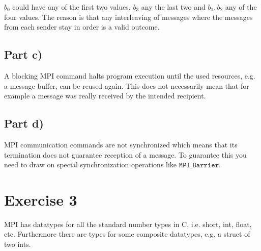 \documentclass[10pt,a4paper]{article}
\begin{document}
$b_{0}$ could have any of the first two values, $b_{3}$ any the last two and $b_{1}, b_{2}$ any of the four values.
The reason is that any interleaving of messages where the messages from each sender stay in order is a valid outcome.

\subsection*{Part c)}

A blocking MPI command halts program execution until the used resources, e.g. a message buffer, can be reused again.
This does not necessarily mean that for example a message was really received by the intended recipient.

\subsection*{Part d)}

MPI communication commands are not synchronized which means that its termination does not guarantee reception of a message.
To guarantee this you need to draw on special synchronization operations like $\mathtt{MPI\_Barrier}$.

\section*{Exercise 3}

MPI has datatypes for all the standard number types in C, i.e. short, int, float, etc.
Furthermore there are types for some composite datatypes, e.g. a struct of two ints.
\end{document}
